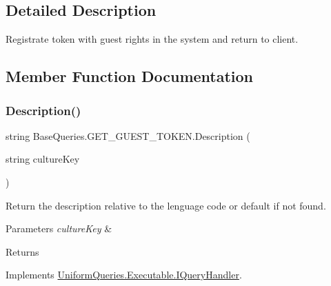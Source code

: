 \subsection{Detailed Description}
Registrate token with guest rights in the system and return to client. 



\subsection{Member Function Documentation}
\mbox{\label{class_base_queries_1_1_g_e_t___g_u_e_s_t___t_o_k_e_n_a06d62fabd5b44fb6b9975da1b72308a2}} 
\subsubsection{\texorpdfstring{Description()}{Description()}}
{\footnotesize\ttfamily string Base\+Queries.\+G\+E\+T\+\_\+\+G\+U\+E\+S\+T\+\_\+\+T\+O\+K\+E\+N.\+Description (\begin{DoxyParamCaption}\item[{string}]{culture\+Key }\end{DoxyParamCaption})}



Return the description relative to the lenguage code or default if not found. 


\begin{DoxyParams}{Parameters}
{\em culture\+Key} & \\
\hline
\end{DoxyParams}
\begin{DoxyReturn}{Returns}

\end{DoxyReturn}


Implements \mbox{\hyperlink{interface_uniform_queries_1_1_executable_1_1_i_query_handler_ae0e55919571d5456af31298394d241a9}{Uniform\+Queries.\+Executable.\+I\+Query\+Handler}}.

\mbox{\label{class_base_queries_1_1_g_e_t___g_u_e_s_t___t_o_k_e_n_afbad0ace27a743793bccea51a5c39db5}} 
